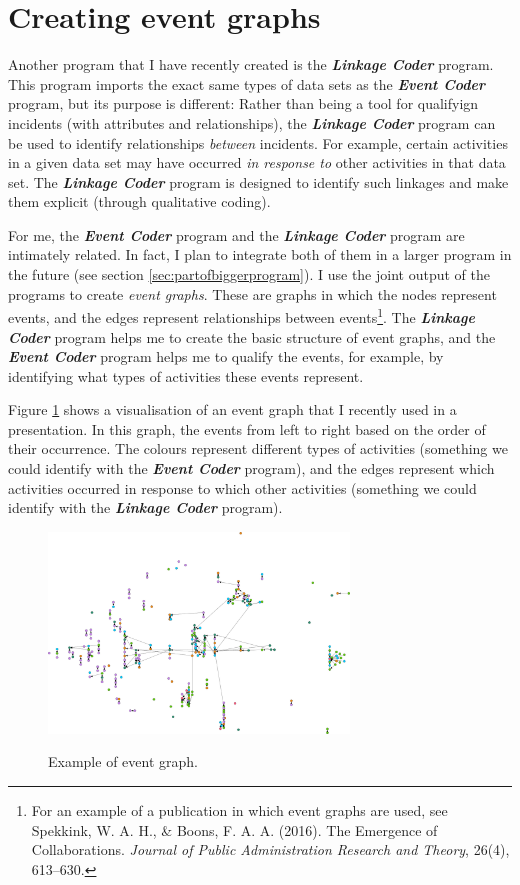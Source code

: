 \documentclass{memoir}
\begin{document}
\section{Creating event graphs}
\label{sec:creatingeventgraphs}

Another program that I have recently created is the \emph{\textbf{Linkage Coder}} program. This program imports the exact same types of data sets as the \emph{\textbf{Event Coder}} program, but its purpose is different: Rather than being a tool for qualifyign incidents (with attributes and relationships), the \textbf{\emph{Linkage Coder}} program can be used to identify relationships \emph{between} incidents. For example, certain activities in a given data set may have occurred \emph{in response to} other activities in that data set. The \emph{\textbf{Linkage Coder}} program is designed to identify such linkages and make them explicit (through qualitative coding).

For me, the \textbf{\emph{Event Coder}} program and the \textbf{\emph{Linkage Coder}} program are intimately related. In fact, I plan to integrate both of them in a larger program in the future (see section \ref{sec:partofbiggerprogram}). I use the joint output of the programs to create \emph{event graphs}. These are graphs in which the nodes represent events, and the edges represent relationships between events\footnote{For an example of a publication in which event graphs are used, see Spekkink, W. A. H., \& Boons, F. A. A. (2016). The Emergence of Collaborations. \emph{Journal of Public Administration Research and Theory}, 26(4), 613–630.}. The \textbf{\emph{Linkage Coder}} program helps me to create the basic structure of event graphs, and the \textbf{\emph{Event Coder}} program helps me to qualify the events, for example, by identifying what types of activities these events represent.

Figure \ref{fig:eventgraph} shows a visualisation of an event graph that I recently used in a presentation. In this graph, the events from left to right based on the order of their occurrence. The colours represent different types of activities (something we could identify with the \emph{\textbf{Event Coder}} program), and the edges represent which activities occurred in response to which other activities (something we could identify with the \textbf{\emph{Linkage Coder}} program).

\begin{figure}[h!]
  \centering
  \caption{Example of event graph.}
  \includegraphics[width=80mm]{Diagram_6.png}
  \label{fig:eventgraph}
\end{figure}
\end{document}
